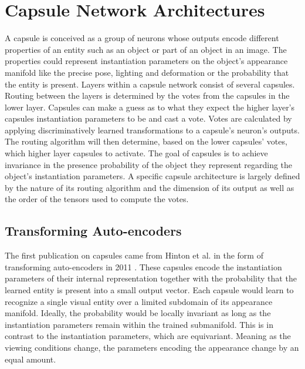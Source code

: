 \chapter{Capsule Network Architectures}\label{chapter:capsules}
A capsule is conceived as a group of neurons whose outputs encode different properties of an entity such as an object or part of an object in an image. The properties could represent instantiation parameters on the object's appearance manifold like the precise pose, lighting and deformation or the probability that the entity is present. Layers within a capsule network consist of several capsules. Routing between the layers is determined by the votes from the capsules in the lower layer. Capsules can make a guess as to what they expect the higher layer's capsules instantiation parameters to be and cast a vote. Votes are calculated by applying discriminatively learned transformations to a capsule's neuron's outputs. The routing algorithm will then determine, based on the lower capsules' votes, which higher layer capsules to activate. The goal of capsules is to achieve invariance in the presence probability of the object they represent regarding the object's instantiation parameters. A specific capsule architecture is largely defined by the nature of its routing algorithm and the dimension of its output as well as the order of the tensors used to compute the votes.

\section{Transforming Auto-encoders}
The first publication on capsules came from Hinton et al. in the form of transforming auto-encoders in 2011 \cite{hinton2011transforming}. These capsules encode the instantiation parameters of their internal representation together with the probability that the learned entity is present into a small output vector. Each capsule would learn to recognize a single visual entity over a limited subdomain of its appearance manifold. Ideally, the probability would be locally invariant as long as the instantiation parameters remain within the trained submanifold. This is in contrast to the instantiation parameters, which are equivariant. Meaning as the viewing conditions change, the parameters encoding the appearance change by an equal amount.

